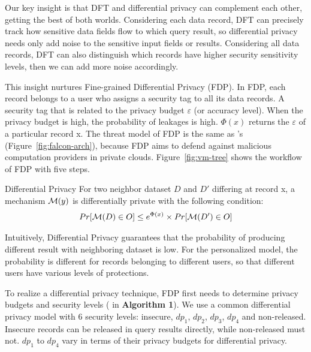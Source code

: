 Our key insight is that DFT and differential privacy can complement each other, 
getting the best of both worlds. Considering each data record, DFT can 
precisely track how sensitive data fields flow to which query result, so 
differential privacy needs only add noise to the sensitive input fields or 
results. Considering all data records, DFT can also distinguish which records 
have higher security sensitivity levels, then we can add more noise accordingly.

This insight nurtures Fine-grained Differential Privacy (FDP). In FDP, each 
record belongs to a user who assigns a security tag to all its data records.
A security tag that is related to the privacy budget $\varepsilon$ (or accuracy 
level). When the privacy budget is high, the probability of leakages is high.
$\Phi(x)$ returns the $\varepsilon$ of a particular 
record x. The threat model of FDP is the same as \kakute's 
(Figure~\ref{fig:falcon-arch}), because FDP aims to defend against malicious 
computation providers in private clouds. Figure~\ref{fig:vm-tree} shows the 
workflow of FDP with five steps.

\begin{definition}{Differential Privacy}
For two neighbor dataset $D$ and $D'$ differing at record x,
a mechanism ${\cal M}(y)$ is differentially private with the following 
condition:
\begin{align}
Pr[{\cal M}(D) \in O] \leq e^{\Phi(x)} \times Pr[{\cal M}(D') \in O]
\end{align}
\end{definition}

Intuitively, Differential Privacy guarantees that the probability of
producing different result with neighboring dataset is low. For the 
personalized model, the probability is different for records belonging to 
different users, so that different users have various levels of protections.

To realize a differential privacy technique, FDP first needs to determine 
privacy budgets and security levels ( in \textbf{Algorithm 1}). 
We use a common differential privacy model with 6 security levels: insecure, 
$dp_1$, $dp_2$, $dp_3$, $dp_4$ and non-released. Insecure records can be 
released in query results directly, while non-released must not. $dp_1$ to 
$dp_4$ vary in terms of their privacy budgets for differential privacy.

